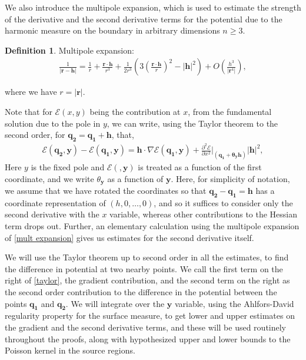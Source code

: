 \documentclass{article}
\newcounter{defn}
\newcounter{lem}
\theoremstyle{plain}
\theoremstyle{plain}
\newcommand{\E}{\mathcal{E}}
\newcommand{\mb}[1]{\mathbf{#1}}
\theoremstyle{definition}
\newtheorem{definition}[defn]{Definition}
\theoremstyle{plain}
\begin{document}
We also introduce the multipole expansion, which is used to estimate the strength of the derivative and the second derivative terms for the potential due to the harmonic measure on the boundary in arbitrary dimensions $n\geq 3$.
\begin{definition} 
Multipole expansion:
\begin{align}\label{mult expansion}
\frac{1}{\lvert \mathbf{r} - \mathbf{h} \rvert}
=
\frac{1}{r}
+ \frac{\mathbf{r} \cdot \mathbf{h}}{r^{3}}
+ \frac{1}{2 r^{3}}
\left(
3 \left( \frac{\mathbf{r} \cdot \mathbf{h}}{r} \right)^{2}
- |\mathbf{h}|^2
\right)
+ O(\frac{h^3}{|\mathbf{r}^4|}),
\end{align}

where we have $r=|\mathbf{r}|$.
\end{definition}

Note that for $\mathcal{E}(x,y)$ being the contribution at $x$, from the fundamental solution due to the pole in $y$, we can write, using the Taylor theorem to the second order, for $\mb{q_2}=\mb{q_1}+\mb{h}$, that, 
\begin{align}\label{taylor}
    \E(\mb{q_2},\mb{y})-\E(\mb{q_1},\mb{y})=\mb{h}\cdot \nabla\E(\mb{q_1},\mb{y})+\frac{\partial^2\E}{\partial x^2}\Big|_{(\mb{q_1 +\theta_y h})}|\mb{h}|^2,
\end{align}
Here $y$ is the fixed pole and $\E(,\mb{y})$ is treated as a function of the first coordinate, and we write $\theta_{\textbf{y}}$ as a function of $\textbf{y}$. Here, for simplicity of notation, we assume that we have rotated the coordinates so that $\mb{q_2}-\mb{q_1}=\mb{h}$ has a coordinate representation of $(h,0,\dots,0)$, and so it suffices to consider only the second derivative with the $x$ variable, whereas other contributions to the Hessian term drops out. Further, an elementary calculation using the multipole expansion of \cref{mult expansion} gives us estimates for the second derivative itself. 

We will use the Taylor theorem up to second order in all the estimates, to find the difference in potential at two nearby points. We call the first term on the right of \cref{taylor}, the gradient contribution, and the second term on the right as the second order contribution to the difference in the potential between the points $\mb{q_1}$ and $\mb{q_2}$. We will integrate over the $\mb{y}$ variable, using the Ahlfors-David regularity property for the surface measure, to get lower and upper estimates on the gradient and the second derivative terms, and these will be used routinely throughout the proofs, along with hypothesized upper and lower bounds to the Poisson kernel in the source regions.
\end{document}
